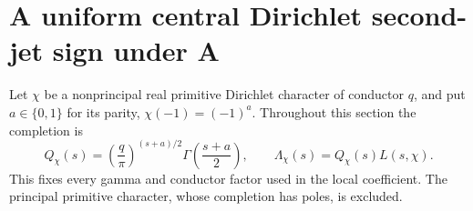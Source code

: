 \section{A uniform central Dirichlet second-jet sign under A}
\label{sec:analytic-central-dirichlet-sign}

Let $\chi$ be a nonprincipal real primitive Dirichlet character of
conductor $q$, and put $a\in\{0,1\}$ for its parity,
$\chi(-1)=(-1)^a$. Throughout this section the completion is
\begin{equation}\label{eq:analytic-dirichlet-completion}
 Q_\chi(s)=\left(\frac q\pi\right)^{(s+a)/2}
                \Gamma\left(\frac{s+a}{2}\right),\qquad
 \Lambda_\chi(s)=Q_\chi(s)L(s,\chi).
\end{equation}
This fixes every gamma and conductor factor used in the local
coefficient. The principal primitive character, whose completion
has poles, is excluded.

